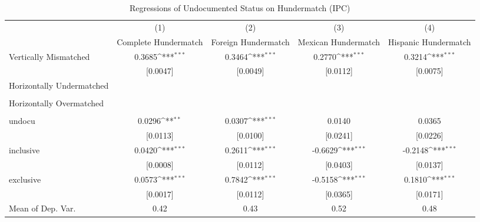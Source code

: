 \begin{table}[htbp]\centering
\def\sym#1{\ifmmode^{#1}\else\(^{#1}\)\fi}
\caption{Regressions of Undocumented Status on Hundermatch (IPC)}
\begin{tabular}{l*{4}{c}}
\toprule
                    &\multicolumn{1}{c}{(1)}         &\multicolumn{1}{c}{(2)}         &\multicolumn{1}{c}{(3)}         &\multicolumn{1}{c}{(4)}         \\
                    &Complete Hundermatch         &Foreign Hundermatch         &Mexican Hundermatch         &Hispanic Hundermatch         \\
\midrule
Vertically Mismatched&      0.3685\sym{***}&      0.3464\sym{***}&      0.2770\sym{***}&      0.3214\sym{***}\\
                    &    [0.0047]         &    [0.0049]         &    [0.0112]         &    [0.0075]         \\
\addlinespace
Horizontally Undermatched&                     &                     &                     &                     \\
                    &                     &                     &                     &                     \\
\addlinespace
Horizontally Overmatched&                     &                     &                     &                     \\
                    &                     &                     &                     &                     \\
\addlinespace
undocu              &      0.0296\sym{**} &      0.0307\sym{***}&      0.0140         &      0.0365         \\
                    &    [0.0113]         &    [0.0100]         &    [0.0241]         &    [0.0226]         \\
\addlinespace
inclusive           &      0.0420\sym{***}&      0.2611\sym{***}&     -0.6629\sym{***}&     -0.2148\sym{***}\\
                    &    [0.0008]         &    [0.0112]         &    [0.0403]         &    [0.0137]         \\
\addlinespace
exclusive           &      0.0573\sym{***}&      0.7842\sym{***}&     -0.5158\sym{***}&      0.1810\sym{***}\\
                    &    [0.0017]         &    [0.0112]         &    [0.0365]         &    [0.0171]         \\
\midrule
Mean of Dep. Var.   &        0.42         &        0.43         &        0.52         &        0.48         \\

\end{tabular}
\end{table}
